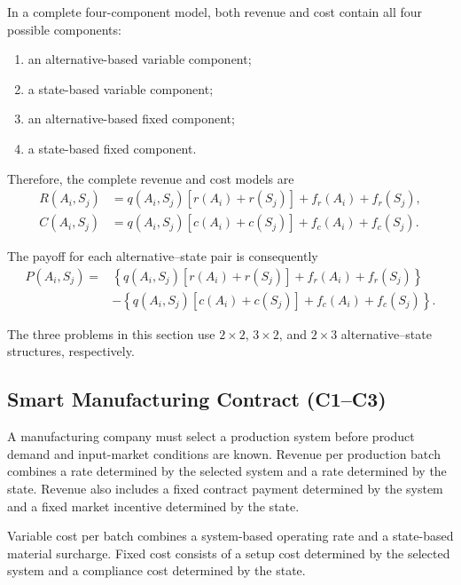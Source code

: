 \vspace{0.8cm}

In a complete four-component model, both revenue and cost contain all four
possible components:

\begin{enumerate}[label=\arabic*.]
	\item an alternative-based variable component;
	\item a state-based variable component;
	\item an alternative-based fixed component;
	\item a state-based fixed component.
\end{enumerate}

Therefore, the complete revenue and cost models are
\[
\begin{aligned}
	R(A_i,S_j)
	&=
	q(A_i,S_j)
	\left[
	r(A_i)+r(S_j)
	\right]
	+
	f_r(A_i)
	+
	f_r(S_j),
	\\
	C(A_i,S_j)
	&=
	q(A_i,S_j)
	\left[
	c(A_i)+c(S_j)
	\right]
	+
	f_c(A_i)
	+
	f_c(S_j).
\end{aligned}
\]

The payoff for each alternative--state pair is consequently
\[
\begin{aligned}
	P(A_i,S_j)
	={}&
	\left\{
	q(A_i,S_j)
	\left[
	r(A_i)+r(S_j)
	\right]
	+
	f_r(A_i)
	+
	f_r(S_j)
	\right\}
	\\
	&-
	\left\{
	q(A_i,S_j)
	\left[
	c(A_i)+c(S_j)
	\right]
	+
	f_c(A_i)
	+
	f_c(S_j)
	\right\}.
\end{aligned}
\]

The three problems in this section use \(2\times2\), \(3\times2\), and
\(2\times3\) alternative--state structures, respectively.

\subsection{Smart Manufacturing Contract (C1--C3)}
\label{sec:problem19-smart-manufacturing-contract-c1-c3}

A manufacturing company must select a production system before product demand
and input-market conditions are known. Revenue per production batch combines a
rate determined by the selected system and a rate determined by the state.
Revenue also includes a fixed contract payment determined by the system and a
fixed market incentive determined by the state.

Variable cost per batch combines a system-based operating rate and a
state-based material surcharge. Fixed cost consists of a setup cost determined
by the selected system and a compliance cost determined by the state.

